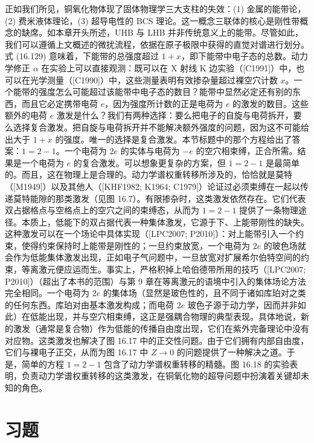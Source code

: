 正如我们所见，铜氧化物体现了固体物理学三大支柱的失效：(1) 金属的能带论，(2) 费米液体理论，(3) 超导电性的 BCS 理论。这一概念三联体的核心是刚性带概念的缺席。如本章开头所述，UHB 与 LHB 并非传统意义上的能带。尽管如此，我们可以遵循上文概述的微扰流程，依据在原子极限中获得的直觉对谱进行划分。式 (16.129) 意味着，下能带的总强度超过 $1+x$，即下能带中电子态的总数。动力学修正 $\alpha$ 在实验上可以直接观测：既可以在 X 射线 K 边实验（[C1991]）中，也可以在光学测量（[C1990]）中，这些测量表明有效掺杂量超过裸空穴计数 $x$。一个能带的强度怎么可能超过该能带中电子态的数目？能带中显然必定还有别的东西，而且它必定携带电荷 $e$，因为强度所计数的正是电荷为 $e$ 的激发的数目。这些额外的电荷 $e$ 激发是什么？我们有两种选择：要么把电子的自旋与电荷拆开，要么选择复合激发。把自旋与电荷拆开并不能解决额外强度的问题，因为这不可能给出大于 $1+x$ 的强度。唯一的选择是复合激发。本节标题中的那个方程给出了答案：$1=2-1$。一个电荷为 $2e$ 的实体与电荷为 $-e$ 的空穴相束缚，正合所需。结果是一个电荷为 $e$ 的复合激发。可以想象更复杂的方案，但 $1=2-1$ 是最简单的。而且，这在物理上是合理的。动力学谱权重转移所涉及的，恰恰就是莫特（[M1949]）以及其他人（[KHF1982; K1964; C1979]）论证过必须束缚在一起以传递莫特能隙的那类激发（见图 16.7）。有限掺杂时，这类激发依然存在。它们代表双占据格点与空格点上的空穴之间的束缚态，从而为 $1=2-1$ 提供了一条物理途径。本质上，低能下的双占据代表一种集体激发，它源于下、上能带刚性的缺失。这种激发可以在一个场论中具体实现（[LPC2007; P2010]）：对上能带引入一个约束，使得约束保持时上能带是刚性的；一旦约束放宽，一个电荷为 $2e$ 的玻色场就会作为低能集体激发出现，正如电子气问题中，一旦放宽对扩展希尔伯特空间的约束，等离激元便应运而生。事实上，严格积掉上哈伯德带所用的技巧（[LPC2007; P2010]）（超出了本书的范围）与第 9 章在等离激元的语境中引入的集体场论方法完全相同。一个电荷为 $2e$ 的集体场（显然是玻色性的，且不同于诸如库珀对之类的任何东西。库珀对由基本激发构成；而电荷 $2e$ 玻色子源于动力学，因而并非如此）在低能出现，并与空穴相束缚，这正是强耦合物理的典型表现。具体地说，新的激发（通常是复合物）作为低能的传播自由度出现，它们在紫外完备理论中没有对应物。这类激发也解决了图 16.17 中的正交性问题。由于它们拥有内部自由度，它们与裸电子正交，从而为图 16.17 中 $Z\to 0$ 的问题提供了一种解决之道。于是，简单的方程 $1=2-1$ 包含了动力学谱权重转移的精髓。图 16.18 的实验表明，负责动力学谱权重转移的这类激发，在铜氧化物的超导问题中扮演着关键却未知的角色。

\section*{习题}

